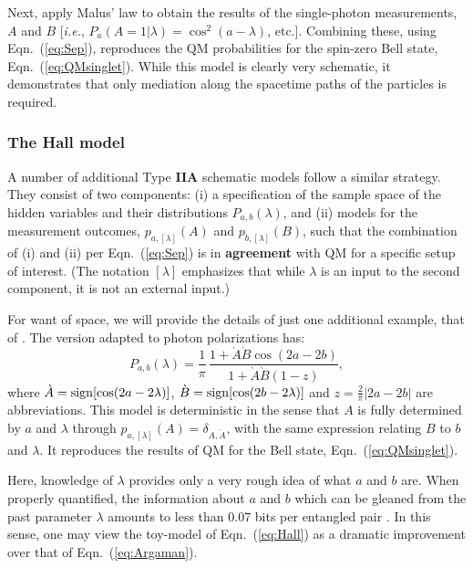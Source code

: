 \documentclass[rmp, aps, preprint, longbibliography]{revtex4-1}
\newcommand{\eq}[1]{{Eqn.~(\ref{#1})}}
\begin{document}
Next, apply Malus' law to obtain the results of the single-photon measurements, $A$ and $B$ [\emph{i.e.}, $P_a(A=1|\lambda)=\cos^2(a-\lambda)$, etc.]. Combining these, using Eqn.~(\ref{eq:Sep}), reproduces the QM probabilities for the spin-zero Bell state, \eq{eq:QMsinglet}.  While this model is clearly very schematic, it demonstrates that only mediation along the spacetime paths of the particles is required.  

\subsubsection{The Hall model}
\label{sec:Hall}

A number of additional Type {\bf IIA} schematic models follow a similar strategy.  They consist of two components: (i) a specification of the sample space of the hidden variables and their distributions $P_{a,b}(\lambda)$, and (ii) models for the measurement outcomes, $p_{a,[\lambda]}(A)$ and $p_{b,[\lambda]}(B)$, such that the combination of (i) and (ii) per Eqn.~(\ref{eq:Sep}) is in {\bf agreement} with QM for a specific setup of interest.  (The notation $[\lambda]$ emphasizes that while $\lambda$ is an input to the second component, it is not an external input.)

For want of space, we will provide the details of just one additional example, that of \textcite{hall2010}.  The version adapted to photon polarizations \cite{argaman2018} has:
\begin{equation}
\label{eq:Hall}
P_{a,b}
(\lambda) = \frac{1}{\pi} \, 
\frac{1 + \grave A \grave B \cos(2a-2b)}{1 + \grave A \grave B (1-z)} ,
\end{equation}
where $\grave A = {\rm sign}[\cos(2a-2\lambda)]$, $\grave B = {\rm sign}[\cos(2b-2\lambda)]$ and $z=\frac{2}{\pi} |2a-2b|$ are abbreviations.  This model is deterministic in the sense that $A$ is fully determined by $a$ and $\lambda$ through $p_{a,[\lambda]}(A)=\delta_{A,\grave A}$, with the same expression relating $B$ to $b$ and $\lambda$.  It reproduces the results of QM for the Bell state, Eqn.~(\ref{eq:QMsinglet}).

Here, knowledge of $\lambda$ provides only a very rough idea of what $a$ and $b$ are.  When properly quantified, the information about $a$ and $b$ which can be gleaned from the past parameter $\lambda$ amounts to less than 0.07 bits per entangled pair \cite{hall2016}.  In this sense, one may view the toy-model of Eqn.~(\ref{eq:Hall}) as a dramatic improvement over that of Eqn.~(\ref{eq:Argaman}).
\end{document}
